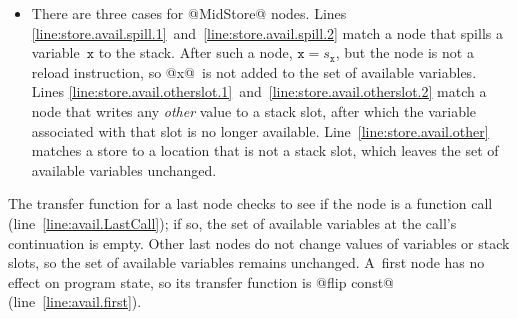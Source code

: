 \documentclass[blockstyle,preprint,natbib,nocopyrightspace]{sigplanconf}
\newcommand\lineref[1]{line~\ref{line:#1}}
\newcommand\Lineref[1]{Line~\ref{line:#1}}
\newcommand\Linepairref[2]{Lines \ref{line:#1}~and~\ref{line:#2}}
\newcommand\slotof[1]{\ensuremath{s_{#1}}}
\let\slotOf=\slotof
\newcommand{\authornote}[1]{{\em #1}}
\def\authornote#1{\unskip\relax}
\newcommand{\simon}[1]{\authornote{SLPJ: #1}}
\newcommand{\norman}[1]{\authornote{NR: #1}}
\let\remark\norman
\newcommand{\john}[1]{\authornote{JD: #1}}
\begin{document}
\begin{itemize}
\item 
There are three cases for @MidStore@ nodes.
\Linepairref{store.avail.spill.1}{store.avail.spill.2}
match a node that spills a variable~$\mathtt{x}$ to the stack.
After such a node, $\mathtt{x} = \slotOf {\mathtt{x}}$,
but the node is not a reload instruction,
so @x@~is not added to the set of available variables.
%
\Linepairref{store.avail.otherslot.1}{store.avail.otherslot.2}
match a node that writes any \emph{other} value to a stack slot,
after which the variable associated with that slot is no longer available.
%
\Lineref{store.avail.other} matches a store to a location that is not
a stack slot, which leaves the set of available variables unchanged.
\end{itemize}


The transfer function for a last node checks to see if the node is a
function call (\lineref{avail.LastCall}); if so, the set of
available variables at the call's continuation is empty.
Other last nodes do not change values of variables or stack slots, 
so the set of available variables remains unchanged.
%
A~first node has no effect on program state, so its transfer function
is @flip const@ (\lineref{avail.first}).
\end{document}
